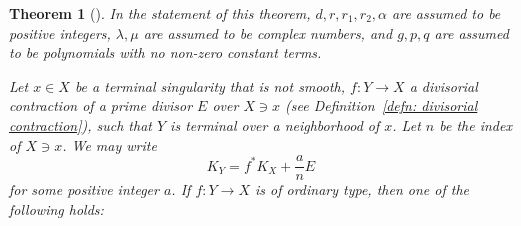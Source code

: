 \documentclass[11pt]{amsart}
\numberwithin{equation}{section}
\newtheorem{thm}{Theorem}[section]
\theoremstyle{definition}
\theoremstyle{definition}
\begin{document}
\begin{thm}[{\cite[Theorem~1.2]{Kaw05}}]\label{thm: kaw05 1.2 strenghthened}
In the statement of this theorem, $d,r,r_1,r_2,\alpha$ are assumed to be positive integers, $\lambda,\mu$ are assumed to be complex numbers, and $g,p,q$ are assumed to be polynomials with no non-zero constant terms.


Let $x\in X$ be a terminal singularity that is not smooth, $f: Y\rightarrow X$ a divisorial contraction of a prime divisor $E$ over $X\ni x$ (see Definition~\ref{defn: divisorial contraction}), such that $Y$ is terminal over a neighborhood of $x$. Let $n$ be the index of $X\ni x$. We may write
$$K_Y=f^*K_X+\frac{a}{n}E$$
for some positive integer $a$. If $f: Y\to X$ is of ordinary type, then one of the following holds:
\begin{enumerate}


\end{enumerate}
\end{thm}
\end{document}
